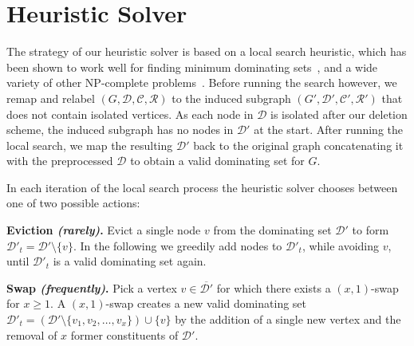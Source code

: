 \documentclass[a4paper, USenglish, cleveref, autoref, thm-restate, noalgorithm2e]{socg-lipics-v2021}
\newcommand{\domset}{\ensuremath{\mathcal D}\xspace}
\newcommand{\cov}{\ensuremath{\mathcal C}\xspace}
\newcommand{\red}{\ensuremath{\mathcal R}\xspace}
\newcommand{\rem}{\ensuremath{\mathcal V'}\xspace}
\newcommand{\cdomset}{\ensuremath{\overline{\mathcal D}}\xspace}
\newcommand{\ccov}{\ensuremath{\overline{\mathcal C}}\xspace}
\newcommand{\cred}{\ensuremath{\overline{\mathcal R}}\xspace}
\newcommand{\crem}{\ensuremath{\overline{\mathcal V'}}\xspace}
\begin{document}
\section{Heuristic Solver}\label{sec:heuristic}
The strategy of our heuristic solver is based on a local search heuristic, which has been shown to work well for finding minimum dominating sets~\cite{DBLP:journals/kbs/ZhuZWSL24}, and a wide variety of other NP-complete problems~\cite{DBLP:journals/jair/CaiSLS13,DBLP:conf/compgeom/MustafaR09}.
Before running the search however, we remap and relabel $(G, \domset, \cov, \red)$ to the induced subgraph $(G', \domset', \cov', \red')$ that does not contain isolated vertices.
As each node in $\domset$ is isolated after our deletion scheme, the induced subgraph has no nodes in $\domset'$ at the start.
After running the local search, we map the resulting $\domset'$ back to the original graph concatenating it with the preprocessed $\domset$ to obtain a valid dominating set for $G$. 

In each iteration of the local search process the heuristic solver chooses between one of two possible actions:
\renewcommand{\domset}{\ensuremath{\mathcal D'}\xspace}
\renewcommand{\cov}{\ensuremath{\mathcal C'}\xspace}
\renewcommand{\red}{\ensuremath{\mathcal R'}\xspace}
\renewcommand{\rem}{\ensuremath{\mathcal V''}\xspace}

\renewcommand{\cdomset}{\ensuremath{\overline{\mathcal D'}}\xspace}
\renewcommand{\ccov}{\ensuremath{\overline{\mathcal C'}}\xspace}
\renewcommand{\cred}{\ensuremath{\overline{\mathcal R'}}\xspace}
\renewcommand{\crem}{\ensuremath{\overline{\mathcal V''}}\xspace}
\medskip

\noindent
\textbf{Eviction \textit{(rarely)}.} 
Evict a single node $v$ from the dominating set $\domset$ to form $\domset_t=\domset \setminus \{v\}$.
In the following we greedily add nodes to $\domset_t$, while avoiding $v$, until $\domset_t$ is a valid dominating set again.
\medskip

\noindent
\textbf{Swap \textit{(frequently)}.}
Pick a vertex $v \in \cdomset$ for which there exists a $(x,1)$-swap for $x\geq 1$.
%
A $(x,1)$-swap creates a new valid dominating set $\domset_t = (\domset \setminus \{v_1,v_2,\ldots,v_x\}) \cup \{v\}$ by the addition of a single new vertex and the removal of $x$ former constituents of $\domset$.
\end{document}
